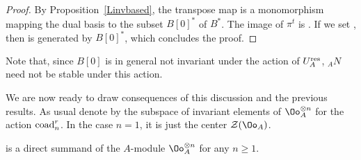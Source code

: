 \begin{proof} By Proposition~\ref{Linvbased}, the transpose map  is a monomorphism mapping the dual basis  to the subset $B[0]^*$ of $B^*$. The image of $\pi^t$ is . If we set , then  is generated by $B[0]^*$, which concludes the proof.
\end{proof}

Note that, since $B[0]$ is in general not invariant under the action of $U_A^{\rm res}$, ${}_A N$ need not be stable under this action.

We are now ready to draw consequences of this discussion and the previous results. As usual denote by  the subspace of invariant elements of $\Oo_A^{\otimes n}$ for the action ${\rm coad}_n^r$. In the case $n=1$, it is just the center $\mathcal{Z}(\Oo_A)$.

\begin{teo}\label{teoLuzstigOAinv}  is a direct summand of the $A$-module $\Oo_A^{\otimes n}$ for any $n\geq 1$.
\end{teo}

